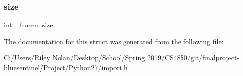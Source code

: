 \subsubsection{\texorpdfstring{size}{size}}
{\footnotesize\ttfamily \mbox{\hyperlink{warnings_8h_a74f207b5aa4ba51c3a2ad59b219a423b}{int}} \+\_\+frozen\+::size}



The documentation for this struct was generated from the following file\+:\begin{DoxyCompactItemize}
\item 
C\+:/\+Users/\+Riley Nolan/\+Desktop/\+School/\+Spring 2019/\+C\+S4850/git/finalproject-\/bluesentinel/\+Project/\+Python27/\mbox{\hyperlink{import_8h}{import.\+h}}\end{DoxyCompactItemize}
